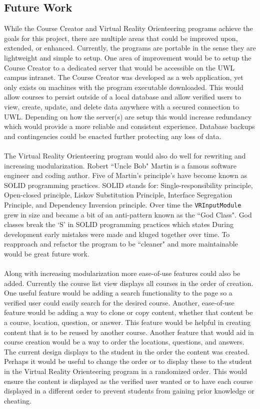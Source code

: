 \subsection{Future Work}
While the Course Creator and Virtual Reality Orienteering programs achieve the goals for this project, there are multiple areas that could be improved upon, extended, or enhanced. Currently, the programs are portable in the sense they are lightweight and simple to setup. One area of improvement would be to setup the Course Creator to a dedicated server that would be accessible on the UWL campus intranet. The Course Creator was developed as a web application, yet only exists on machines with the program executable downloaded. This would allow courses to persist outside of a local database and allow verified users to view, create, update, and delete data anywhere with a secured connection to UWL. Depending on how the server(s) are setup this would increase redundancy which would provide a more reliable and consistent experience. Database backups and contingencies could be enacted further protecting any loss of data.\\
\\
The Virtual Reality Orienteering program would also do well for rewriting and increasing modularization. Robert ``Uncle Bob" Martin is a famous software engineer and coding author. Five of Martin's principle's have become known as SOLID programming practices. SOLID stands for: Single-responsibility principle, Open-closed principle, Liskov Substitution Principle, Interface Segregation Principle, and Dependency Inversion principle. Over time the \lstinline{VRInputModule} grew in size and became a bit of an anti-pattern known as the ``God Class".  God classes break the `S' in SOLID programming practices which states  During development early mistakes were made and kluged together over time. To reapproach and refactor the program to be ``cleaner" and more maintainable would be great future work.\\
\\
Along with increasing modularization more ease-of-use features could also be added. Currently the course list view displays all courses in the order of creation. One useful feature would be adding a search functionality to the page so a verified user could easily search for the desired course. Another, ease-of-use feature would be adding a way to clone or copy content, whether that content be a course, location, question, or answer. This feature would be helpful in creating content that is to be reused by another course. Another feature that would aid in course creation would be a way to order the locations, questions, and answers. The current design displays to the student in the order the content was created. Perhaps it would be useful to change the order or to display these to the student in the Virtual Reality Orienteering program in a randomized order. This would ensure the content is displayed as the verified user wanted or to have each course displayed in a different order to prevent students from gaining prior knowledge or cheating.
